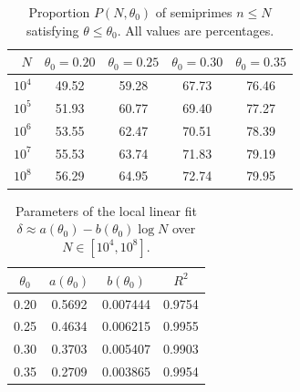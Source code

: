 
\begin{table}[htbp]
\centering
\caption{Proportion \(P(N,\theta_0)\) of semiprimes \(n \leq N\) satisfying
\(\theta \leq \theta_0\). All values are percentages.}
\label{tab:convergence}
\begin{tabular}{rcccc}
\toprule
\(N\) & \(\theta_0 = 0.20\) & \(\theta_0 = 0.25\) & \(\theta_0 = 0.30\) & \(\theta_0 = 0.35\) \\
\midrule

\(10^4\) & 49.52 & 59.28 & 67.73 & 76.46 \\
\(10^5\) & 51.93 & 60.77 & 69.40 & 77.27 \\
\(10^6\) & 53.55 & 62.47 & 70.51 & 78.39 \\
\(10^7\) & 55.53 & 63.74 & 71.83 & 79.19 \\
\(10^8\) & 56.29 & 64.95 & 72.74 & 79.95 \\

\bottomrule
\end{tabular}
\end{table}


\begin{table}[htbp]
\centering
\caption{Parameters of the local linear fit
\(\delta \approx a(\theta_0)-b(\theta_0)\log N\) over \(N\in[10^4,10^8]\).}
\label{tab:fit}
\begin{tabular}{cccc}
\toprule
\(\theta_0\) & \(a(\theta_0)\) & \(b(\theta_0)\) & \(R^2\) \\
\midrule

0.20 & 0.5692 & 0.007444 & 0.9754 \\
0.25 & 0.4634 & 0.006215 & 0.9955 \\
0.30 & 0.3703 & 0.005407 & 0.9903 \\
0.35 & 0.2709 & 0.003865 & 0.9954 \\

\bottomrule
\end{tabular}
\end{table}


\begin{table}[htbp]
\centering
\caption{Empirical \(b_{\mathrm{eff}}\) vs. heuristic prefactors.}
\label{tab:prefactor}
\end{table}

